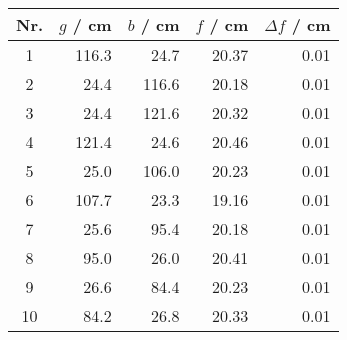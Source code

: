 \begin{tabular}{c|rrrr}
Nr. & $g$ / cm & $b$ / cm & $f$ / cm & $\Delta f$ / cm \\
\hline
1 & 116.3 & 24.7 & 20.37 & 0.01\\
2 & 24.4 & 116.6 & 20.18 & 0.01\\
3 & 24.4 & 121.6 & 20.32 & 0.01\\
4 & 121.4 & 24.6 & 20.46 & 0.01\\
5 & 25.0 & 106.0 & 20.23 & 0.01\\
6 & 107.7 & 23.3 & 19.16 & 0.01\\
7 & 25.6 & 95.4 & 20.18 & 0.01\\
8 & 95.0 & 26.0 & 20.41 & 0.01\\
9 & 26.6 & 84.4 & 20.23 & 0.01\\
10 & 84.2 & 26.8 & 20.33 & 0.01
\end{tabular}
